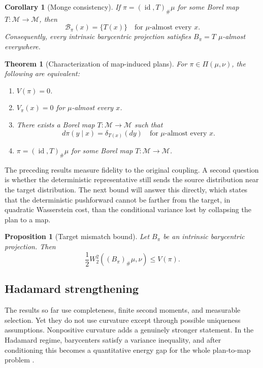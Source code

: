 \documentclass[10pt]{article} %
\newtheorem{theorem}{Theorem}
\newtheorem{proposition}[proposition]{Proposition}
\newtheorem{corollary}[corollary]{Corollary}
\theoremstyle{definition}
\providecommand{\1}{\mathbf{1}}
\providecommand{\sM}{\mathcal{M}}
\DeclareMathOperator{\id}{id}
\begin{document}
\begin{corollary}[Monge consistency]
\label{cor:monge_consistency}
If $\pi=(\id,T)_\#\mu$ for some Borel map $T:\sM\to\sM$, then
\[
\mathcal B_\pi(x)=\{T(x)\}
\quad\text{for }\mu\text{-almost every }x.
\]
Consequently, every intrinsic barycentric projection satisfies $B_\pi=T$ $\mu$-almost everywhere.
\end{corollary}


\begin{theorem}[Characterization of map-induced plans]
\label{thm:monge_characterization}
For $\pi\in\Pi(\mu,\nu)$, the following are equivalent:
\begin{enumerate}[label=(\roman*)]
    \item $V(\pi)=0$.
    \item $V_\pi(x)=0$ for $\mu$-almost every $x$.
    \item There exists a Borel map $T:\sM\to\sM$ such that
    \[
    d\pi(y\mid x)=\delta_{T(x)}(dy)
    \quad\text{for }\mu\text{-almost every }x.
    \]
    \item $\pi=(\id,T)_\#\mu$ for some Borel map $T:\sM\to\sM$.
\end{enumerate}
\end{theorem}




The preceding results measure fidelity to the original coupling. A second question is whether the deterministic representative still sends the source distribution near the target distribution. The next bound will answer this directly, which states that the deterministic pushforward cannot be farther from the target, in quadratic Wasserstein cost, than the conditional variance  lost by collapsing the plan to a map.

\begin{proposition}[Target mismatch bound]
\label{prop:target_mismatch}
Let $B_\pi$ be an intrinsic barycentric projection. Then
\[
\frac12 W_2^2((B_\pi)_\#\mu,\nu)\le V(\pi).
\]
\end{proposition}


\subsection{Hadamard strengthening}

The results so far use completeness, finite second moments, and measurable selection. Yet they do not use curvature except through possible uniqueness assumptions. Nonpositive curvature adds a genuinely stronger statement. In the Hadamard regime, barycenters satisfy a variance inequality, and after conditioning this becomes a quantitative energy gap for the whole plan-to-map problem \citep{sturm_2003_ProbabilityMeasuresMetric}. 
\end{document}
